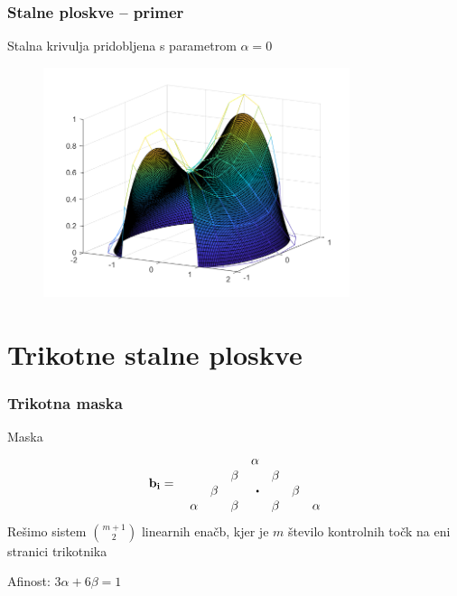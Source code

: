 \documentclass{beamer}
\newcommand\sbullet[1][.5]{\mathbin{\vcenter{\hbox{\scalebox{#1}{$\bullet$}}}}}
\begin{document}
\begin{frame}
    \frametitle{Stalne ploskve -- primer}
    Stalna krivulja pridobljena s parametrom $\alpha = 0$ 
    \begin{figure}
        \includegraphics[width=0.8\textwidth]{square_0.png}
    \end{figure}
\end{frame}


\section{Trikotne stalne ploskve}


\begin{frame}
    \frametitle{Trikotna maska}
    \begin{block}{Maska}
    $$
    \mathbf{b}_{\mathbf{i}} =  \quad 
    \begin{matrix*}[r]
            &       &       & \alpha   &       &       & \\
            &       & \beta &          & \beta &       & \\
            & \beta &       & \sbullet &       & \beta & \\
    \alpha &       & \beta &          & \beta &       & \alpha
    \end{matrix*}
    $$
    Rešimo sistem $\binom{m+1}{2}$
    linearnih enačb, kjer je $m$ število kontrolnih točk 
    na eni stranici trikotnika

    Afinost: $3\alpha + 6\beta = 1$
    \end{block}
\end{frame}
\end{document}
